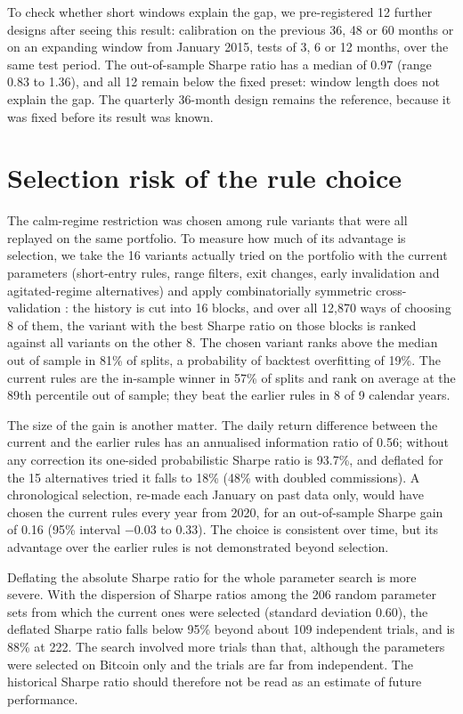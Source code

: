 \documentclass[11pt,a4paper]{article}
\newcommand{\1}{\mathbf{1}}
\begin{document}
To check whether short windows explain the gap, we pre-registered 12 further designs after seeing this result: calibration on the previous 36, 48 or 60 months or on an expanding window from January 2015, tests of 3, 6 or 12 months, over the same test period. The out-of-sample Sharpe ratio has a median of 0.97 (range 0.83 to 1.36), and all 12 remain below the fixed preset: window length does not explain the gap. The quarterly 36-month design remains the reference, because it was fixed before its result was known.

\section{Selection risk of the rule choice}\label{sec:selection}

The calm-regime restriction was chosen among rule variants that were all replayed on the same portfolio. To measure how much of its advantage is selection, we take the 16 variants actually tried on the portfolio with the current parameters (short-entry rules, range filters, exit changes, early invalidation and agitated-regime alternatives) and apply combinatorially symmetric cross-validation \citep{BaileyEtAl2017}: the history is cut into 16 blocks, and over all 12{,}870 ways of choosing 8 of them, the variant with the best Sharpe ratio on those blocks is ranked against all variants on the other 8. The chosen variant ranks above the median out of sample in 81\% of splits, a probability of backtest overfitting of 19\%. The current rules are the in-sample winner in 57\% of splits and rank on average at the 89th percentile out of sample; they beat the earlier rules in 8 of 9 calendar years.

The size of the gain is another matter. The daily return difference between the current and the earlier rules has an annualised information ratio of 0.56; without any correction its one-sided probabilistic Sharpe ratio is 93.7\%, and deflated for the 15 alternatives tried \citep{BaileyLopezdePrado2014} it falls to 18\% (48\% with doubled commissions). A chronological selection, re-made each January on past data only, would have chosen the current rules every year from 2020, for an out-of-sample Sharpe gain of 0.16 (95\% interval \ensuremath{-}0.03 to 0.33). The choice is consistent over time, but its advantage over the earlier rules is not demonstrated beyond selection.

Deflating the absolute Sharpe ratio for the whole parameter search is more severe. With the dispersion of Sharpe ratios among the 206 random parameter sets from which the current ones were selected (standard deviation 0.60), the deflated Sharpe ratio falls below 95\% beyond about 109 independent trials, and is 88\% at 222. The search involved more trials than that, although the parameters were selected on Bitcoin only and the trials are far from independent. The historical Sharpe ratio should therefore not be read as an estimate of future performance.
\end{document}
